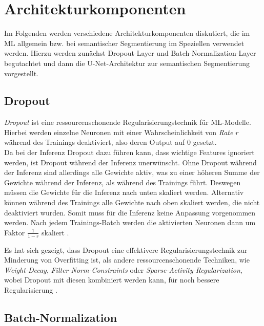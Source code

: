 \section{Architekturkomponenten}

Im Folgenden werden verschiedene Architekturkomponenten diskutiert, die im \ac{ML} allgemein 
bzw. bei semantischer Segmentierung im Speziellen verwendet werden. Hierzu werden zunächst Dropout-Layer 
und Batch-Normalization-Layer begutachtet und dann die U-Net-Architektur zur semantischen Segmentierung vorgestellt. 

\subsection{Dropout} \label{sec:architekturkomponenten:dropout}

\textit{Dropout} ist eine ressourcenschonende Regularisierungstechnik für \ac{ML}-Modelle. 
Hierbei werden einzelne Neuronen mit einer Wahrscheinlichkeit von \textit{Rate} $r$ während des Trainings 
deaktiviert, also deren Output auf $0$ gesetzt.\\ 
Da bei der Inferenz Dropout dazu führen kann, 
dass wichtige Features ignoriert werden, ist Dropout während der Inferenz unerwünscht. Ohne Dropout während der 
Inferenz sind allerdings alle Gewichte aktiv, was zu einer höheren Summe der Gewichte während der Inferenz, 
als während des Trainings führt. Deswegen müssen die Gewichte für die Inferenz nach unten skaliert werden. 
Alternativ können während des Trainings alle Gewichte nach oben skaliert werden, die nicht deaktiviert wurden. 
Somit muss für die Inferenz keine Anpassung vorgenommen werden. Nach jedem Trainings-Batch werden die aktivierten 
Neuronen dann um Faktor $\frac{1}{1-r}$ skaliert \cites[S.~255--258]{Goodfellow.2016}{NitishSrivastava.2014}.

Es hat sich gezeigt, dass Dropout eine effektivere Regularisierungstechnik zur Minderung von Overfitting ist, 
als andere ressourcenschonende Techniken, wie \textit{Weight-Decay}, \textit{Filter-Norm-Constraints} oder 
\textit{Sparse-Activity-Regularization}, wobei Dropout mit diesen kombiniert werden kann, für noch bessere 
Regularisierung \cites[S.~265]{Goodfellow.2016}.

\subsection{Batch-Normalization} \label{sec:architekturkomponenten:batchnorm}

